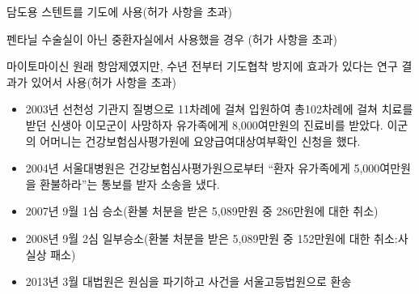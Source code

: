 담도용 스텐트를 기도에 사용(허가 사항을 초과)\par
펜타닐 수술실이 아닌 중환자실에서 사용했을 경우 (허가 사항을 초과) \par
마이토마이신 원래 항암제였지만, 수년 전부터 기도협착 방지에 효과가 있다는 연구 결과가 있어서 사용(허가 사항을 초과)\par

\begin{itemize}\tightlist
\item 2003년 선천성 기관지 질병으로 11차례에 걸쳐 입원하여 총102차례에 걸쳐 치료를 받던 신생아 이모군이 사망하자 유가족에게 8,000여만원의 진료비를 받았다.
이군의 어머니는 건강보험심사평가원에 요양급여대상여부확인 신청을 했다. 
\item 2004년 서울대병원은 건강보험심사평가원으로부터 “환자 유가족에게 5,000여만원을 환불하라”는 통보를 받자 소송을 냈다.
\item 2007년 9월 1심 승소(환불 처분을 받은 5,089만원 중 286만원에 대한 취소)
\item 2008년 9월 2심 일부승소(환불 처분을 받은 5,089만원 중 152만원에 대한 취소:사실상 패소)
\item 2013년 3월 대법원은 원심을 파기하고 사건을 서울고등법원으로 환송
\end{itemize}
